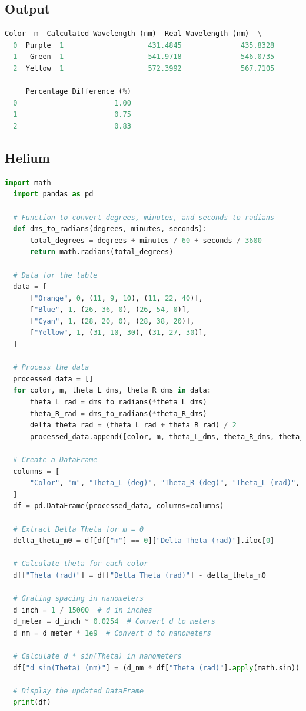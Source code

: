 \documentclass[a4paper,11pt]{article}
\begin{document}
\subsection*{Output}
\begin{lstlisting}[language=Python]
  Color  m  Calculated Wavelength (nm)  Real Wavelength (nm)  \
  0  Purple  1                    431.4845              435.8328   
  1   Green  1                    541.9718              546.0735   
  2  Yellow  1                    572.3992              567.7105   
  
     Percentage Difference (%)  
  0                       1.00  
  1                       0.75  
  2                       0.83
\end{lstlisting}

\newpage
%
\subsection*{Helium}
\begin{lstlisting}[language=Python]
  import math
  import pandas as pd
  
  # Function to convert degrees, minutes, and seconds to radians
  def dms_to_radians(degrees, minutes, seconds):
      total_degrees = degrees + minutes / 60 + seconds / 3600
      return math.radians(total_degrees)
  
  # Data for the table
  data = [
      ["Orange", 0, (11, 9, 10), (11, 22, 40)],
      ["Blue", 1, (26, 36, 0), (26, 54, 0)],
      ["Cyan", 1, (28, 20, 0), (28, 38, 20)],
      ["Yellow", 1, (31, 10, 30), (31, 27, 30)],
  ]
  
  # Process the data
  processed_data = []
  for color, m, theta_L_dms, theta_R_dms in data:
      theta_L_rad = dms_to_radians(*theta_L_dms)
      theta_R_rad = dms_to_radians(*theta_R_dms)
      delta_theta_rad = (theta_L_rad + theta_R_rad) / 2
      processed_data.append([color, m, theta_L_dms, theta_R_dms, theta_L_rad, theta_R_rad, delta_theta_rad])
  
  # Create a DataFrame
  columns = [
      "Color", "m", "Theta_L (deg)", "Theta_R (deg)", "Theta_L (rad)", "Theta_R (rad)", "Delta Theta (rad)"
  ]
  df = pd.DataFrame(processed_data, columns=columns)
  
  # Extract Delta Theta for m = 0
  delta_theta_m0 = df[df["m"] == 0]["Delta Theta (rad)"].iloc[0]
  
  # Calculate theta for each color
  df["Theta (rad)"] = df["Delta Theta (rad)"] - delta_theta_m0
  
  # Grating spacing in nanometers
  d_inch = 1 / 15000  # d in inches
  d_meter = d_inch * 0.0254  # Convert d to meters
  d_nm = d_meter * 1e9  # Convert d to nanometers
  
  # Calculate d * sin(Theta) in nanometers
  df["d sin(Theta) (nm)"] = (d_nm * df["Theta (rad)"].apply(math.sin)).round(4)
  
  # Display the updated DataFrame
  print(df)
\end{lstlisting}
\end{document}
